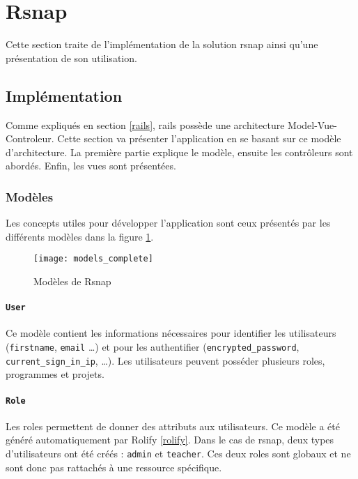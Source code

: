 \section{Rsnap}
\graphicspath{{content/7-solution/3-rsnap/images/}}
Cette section traite de l'implémentation de la solution \gls{rsnap} ainsi qu'une présentation de son utilisation.

\subsection{Implémentation}
Comme expliqués en section \ref{rails}, \gls{rails} possède une architecture Model-Vue-Controleur. Cette section va présenter l'application en se basant sur ce modèle d'architecture. La première partie explique le modèle, ensuite les contrôleurs sont abordés. Enfin, les vues sont présentées.

\subsubsection{Modèles}
Les concepts utiles pour développer l'application sont ceux présentés par les différents modèles dans la figure \ref{fig:models}.

\begin{figure}
 \begin{center}
   \texttt{[image: models\_complete]}
   \caption{Modèles de Rsnap}
   \label{fig:models}
 \end{center}
\end{figure}

\paragraph{\texttt{User}} Ce modèle contient les informations nécessaires pour identifier les utilisateurs (\texttt{firstname}, \texttt{email} \ldots) et pour les authentifier (\texttt{encrypted\_password}, \texttt{current\_sign\_in\_ip}, \ldots). Les utilisateurs peuvent posséder plusieurs \glspl{role}, programmes et projets.

\paragraph{\texttt{Role}} Les \glspl{role} permettent de donner des attributs aux utilisateurs. Ce modèle a été généré automatiquement par Rolify \ref{rolify}. Dans le cas de \gls{rsnap}, deux types d'utilisateurs ont été créés : \texttt{admin} et \texttt{teacher}. Ces deux \glspl{role} sont globaux et ne sont donc pas rattachés à une ressource spécifique.


